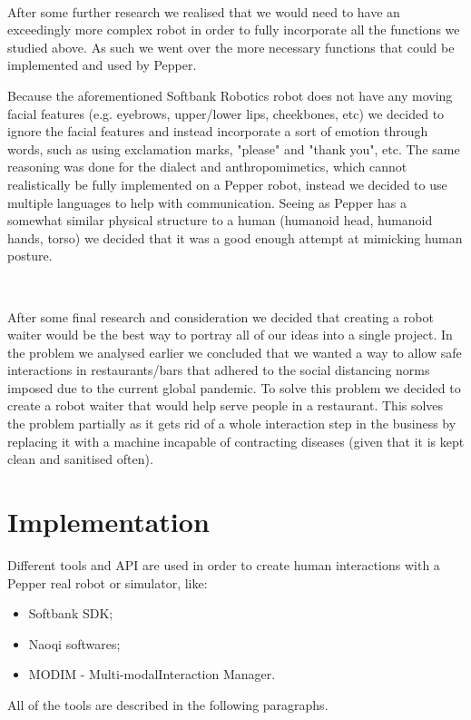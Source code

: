 \documentclass[12pt, letterpaper, twoside]{article}
\begin{document}
\

After some further research we realised that we would need to have an exceedingly more complex robot in order to fully incorporate all the functions we studied above. As such we went over the more necessary functions that could be implemented and used by Pepper.

Because the aforementioned Softbank Robotics robot does not have any moving facial features (e.g. eyebrows, upper/lower lips, cheekbones, etc) we decided to ignore the facial features and instead incorporate a sort of emotion through words, such as using exclamation marks, "please" and "thank you", etc. The same reasoning was done for the dialect and anthropomimetics, which cannot realistically be fully implemented on a Pepper robot, instead we decided to use multiple languages to help with communication. Seeing as Pepper has a somewhat similar physical structure to a human (humanoid head, humanoid hands, torso) we decided that it was a good enough attempt at mimicking human posture.

\

After some final research and consideration we decided that creating a robot waiter would be the best way to portray all of our ideas into a single project.
In the problem we analysed earlier we concluded that we wanted a way to allow safe interactions in restaurants/bars that adhered to the social distancing norms imposed due to the current global pandemic. To solve this problem we decided to create a robot waiter that would help serve people in a restaurant. This solves the problem partially as it gets rid of a whole interaction step in the business by replacing it with a machine incapable of contracting diseases (given that it is kept clean and sanitised often). 

\section{Implementation}
Different tools and API are used in order to create human interactions with a Pepper real robot or simulator, like:

\begin{itemize}
	\item Softbank SDK;
	\item Naoqi softwares;
	\item MODIM - Multi-modalInteraction Manager.
\end{itemize}

All of the tools are described in the following paragraphs.\\
\end{document}
